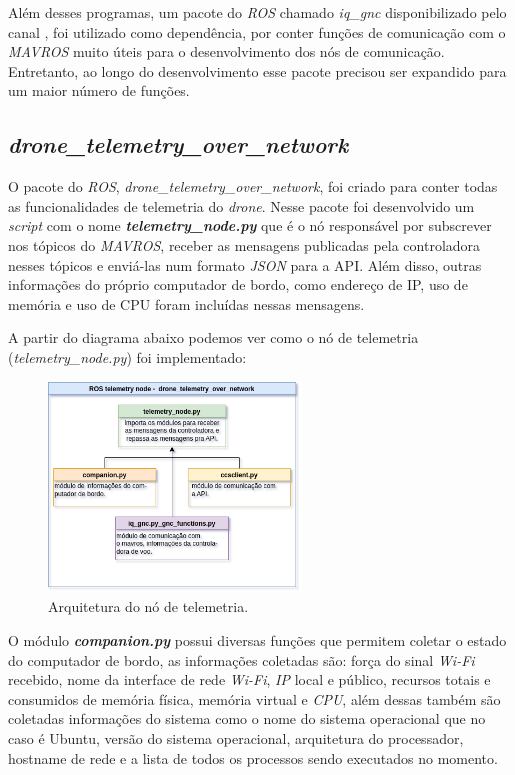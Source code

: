 \documentclass[12pt,a4paper,oneside]{book}
\begin{document}
Além desses programas, um pacote do \textit{ROS} chamado \textit{iq\_gnc} disponibilizado pelo canal \cite{url:iq}, foi utilizado como dependência, por conter funções de comunicação com o \textit{MAVROS} muito úteis para o desenvolvimento dos nós de comunicação. Entretanto, ao longo do desenvolvimento esse pacote precisou ser expandido para um maior número de funções.

\subsection{\textit{drone\_telemetry\_over\_network}}

O pacote do \textit{ROS}, \textit{drone\_telemetry\_over\_network}, foi criado para conter todas as funcionalidades de telemetria do \textit{drone}. Nesse pacote foi desenvolvido um \textit{script} com o nome \textbf{\textit{telemetry\_node.py}} que é o nó responsável por subscrever nos tópicos do \textit{MAVROS}, receber as mensagens publicadas pela controladora nesses tópicos e enviá-las num formato \textit{JSON} para a API. Além disso, outras informações do próprio computador de bordo, como endereço de IP, uso de memória e uso de CPU foram incluídas nessas mensagens.

A partir do diagrama abaixo podemos ver como o nó de telemetria (\textit{telemetry\_node.py}) foi implementado:
%
\begin{figure}[H]
  \centering
  \includegraphics[width=0.6\textwidth]{Images/Desenvolvimento/telemetry_arq.png}
  \caption{Arquitetura do nó de telemetria.}
  \label{fig:telemetry_arq.png.0}
\end{figure}
%

O módulo \textbf{\textit{companion.py}} possui diversas funções que permitem coletar o estado do computador de bordo, as informações coletadas são: força do sinal \textit{Wi-Fi} recebido, nome da interface de rede \textit{Wi-Fi}, \textit{IP} local e público, recursos totais e consumidos de memória física, memória virtual e \textit{CPU}, além dessas também são coletadas informações do sistema como o nome do sistema operacional que no caso é Ubuntu, versão do sistema operacional, arquitetura do processador, hostname de rede e a lista de todos os processos sendo executados no momento.  
\end{document}
